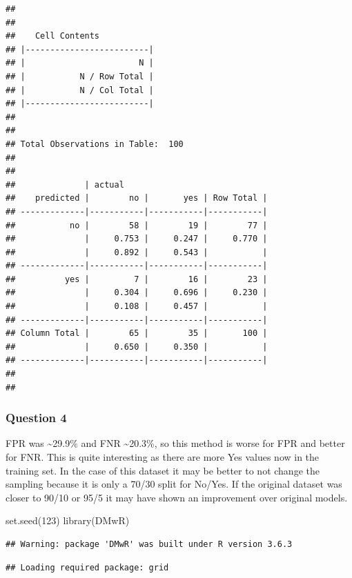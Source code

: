 \documentclass[]{article}
\newenvironment{Shaded}{\begin{snugshade}}{\end{snugshade}}
\newcommand{\DecValTok}[1]{\textcolor[rgb]{0.00,0.00,0.81}{#1}}
\newcommand{\FunctionTok}[1]{\textcolor[rgb]{0.00,0.00,0.00}{#1}}
\newcommand{\NormalTok}[1]{#1}
\begin{document}
\begin{verbatim}
## 
##  
##    Cell Contents
## |-------------------------|
## |                       N |
## |           N / Row Total |
## |           N / Col Total |
## |-------------------------|
## 
##  
## Total Observations in Table:  100 
## 
##  
##              | actual 
##    predicted |        no |       yes | Row Total | 
## -------------|-----------|-----------|-----------|
##           no |        58 |        19 |        77 | 
##              |     0.753 |     0.247 |     0.770 | 
##              |     0.892 |     0.543 |           | 
## -------------|-----------|-----------|-----------|
##          yes |         7 |        16 |        23 | 
##              |     0.304 |     0.696 |     0.230 | 
##              |     0.108 |     0.457 |           | 
## -------------|-----------|-----------|-----------|
## Column Total |        65 |        35 |       100 | 
##              |     0.650 |     0.350 |           | 
## -------------|-----------|-----------|-----------|
## 
## 
\end{verbatim}

\hypertarget{question-4-1}{%
\subsubsection{Question 4}\label{question-4-1}}

FPR was \textasciitilde29.9\% and FNR \textasciitilde20.3\%, so this
method is worse for FPR and better for FNR. This is quite interesting as
there are more Yes values now in the training set. In the case of this
dataset it may be better to not change the sampling because it is only a
70/30 split for No/Yes. If the original dataset was closer to 90/10 or
95/5 it may have shown an improvement over original models.

\begin{Shaded}
\begin{Highlighting}[]
\FunctionTok{set.seed}\NormalTok{(}\DecValTok{123}\NormalTok{)}
\FunctionTok{library}\NormalTok{(DMwR)}
\end{Highlighting}
\end{Shaded}

\begin{verbatim}
## Warning: package 'DMwR' was built under R version 3.6.3
\end{verbatim}

\begin{verbatim}
## Loading required package: grid
\end{verbatim}
\end{document}
